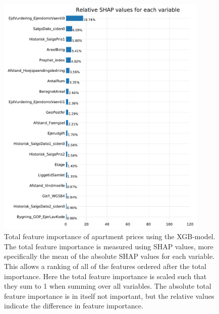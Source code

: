 \documentclass[a4paper, twoside, nobib]{tufte-book}
\begin{document}
\begin{figure}
  \includegraphics[width=0.9\textwidth, trim=0 0 0 40, clip]{figures/housing/Ejerlejlighed_v18_cut_all_Ncols_all_xgb_tight_SHAP_vals_summary_all.pdf}
  \caption[Total feature importance of apartment prices using XGB]
          {Total feature importance of apartment prices using the XGB-model. The total feature importance is measured using SHAP values, more specifically the mean of the absolute SHAP values for each variable. This allows a ranking of all of the features ordered after the total importance. Here the total feature importance is scaled such that they sum to 1 when summing over all variables. The absolute total feature importance is in itself not important, but the relative values indicate the difference in feature importance. 
          } 
  \label{fig:h:shap_overview_total}
\end{figure}
\end{document}
